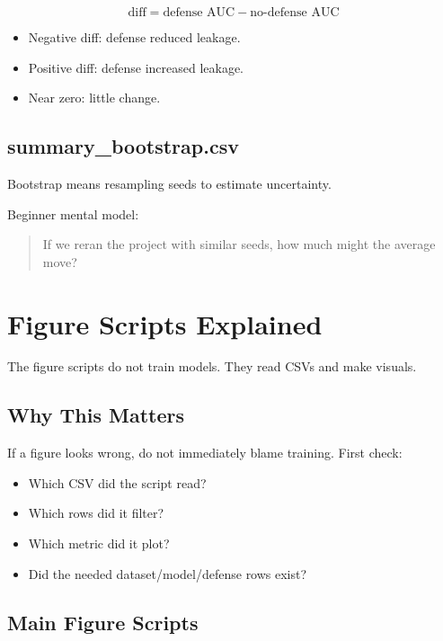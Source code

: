 \documentclass[11pt,a4paper]{article}
\begin{document}
\[
\text{diff} = \text{defense AUC} - \text{no-defense AUC}
\]

\begin{itemize}
  \item Negative diff: defense reduced leakage.
  \item Positive diff: defense increased leakage.
  \item Near zero: little change.
\end{itemize}

\subsection{summary\_bootstrap.csv}

Bootstrap means resampling seeds to estimate uncertainty.

Beginner mental model:

\begin{quote}
If we reran the project with similar seeds, how much might the average move?
\end{quote}

\section{Figure Scripts Explained}

The figure scripts do not train models. They read CSVs and make visuals.

\subsection{Why This Matters}

If a figure looks wrong, do not immediately blame training. First check:

\begin{itemize}
  \item Which CSV did the script read?
  \item Which rows did it filter?
  \item Which metric did it plot?
  \item Did the needed dataset/model/defense rows exist?
\end{itemize}

\subsection{Main Figure Scripts}
\end{document}
